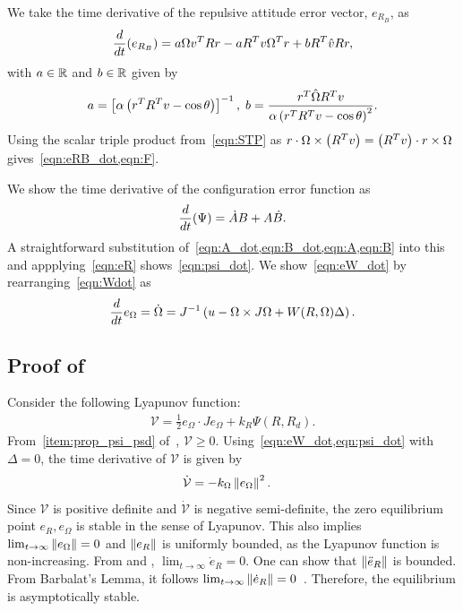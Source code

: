 \documentclass[fleqn]{IJCAS}  %
\begin{document}
\begin{multicols}{2}
We take the time derivative of the repulsive attitude error vector, \( e_{R_B} \), as
\begin{gather*}
	\frac{d }{d t}( e_{R_B} )= a \Omega v^T R r - a R^T v \Omega^T r + b R^T \hat{v} R r ,
\end{gather*}
with \( a \in \mathbb{R} \) and \( b \in \mathbb{R}\) given by 
\begin{gather*}
	a = \left[ \alpha \left( r^T R^T v - \cos \theta \right) \right]^{-1} , \;
	b = \frac{r^T \hat{\Omega} R^T v}{\alpha \left( r^T R^T v - \cos \theta \right)^2} .
\end{gather*}
Using the scalar triple product from~\cref{eqn:STP} as \( r \cdot \Omega \times \left( R^T v \right) = \left( R^T v \right) \cdot r \times \Omega \) gives~\cref{eqn:eRB_dot,eqn:F}.

We show the time derivative of the configuration error function as
\begin{gather*}
	\frac{d }{d t} (\Psi) = \dot{A} B + A \dot{B} .
\end{gather*}
A straightforward substitution of~\cref{eqn:A_dot,eqn:B_dot,eqn:A,eqn:B} into this and appplying~\cref{eqn:eR} shows~\cref{eqn:psi_dot}.
We show~\cref{eqn:eW_dot} by rearranging~\cref{eqn:Wdot} as 
\begin{align*}
	\frac{d }{d t} e_\Omega = \dot{\Omega} = J^{-1} \left( u - \Omega \times J \Omega + W(R,\Omega) \Delta  \right) .
\end{align*}

\subsection{Proof of~}\label{proof:att_control}
Consider the following Lyapunov function:
\begin{gather*}%
	\mathcal{V} = \frac{1}{2} e_\Omega \cdot J e_\Omega + k_R \Psi(R,R_d) . 
\end{gather*}
From~\cref{item:prop_psi_psd} of~, \(\mathcal{V} \geq 0 \).
Using~\cref{eqn:eW_dot,eqn:psi_dot} with \( \Delta = 0 \), the time derivative of \( \mathcal{V} \) is given by
\begin{align*}%
	\dot{\mathcal{V}} &= -k_\Omega \norm{e_\Omega}^2 . 
\end{align*}
Since \( \mathcal{V} \) is positive definite and \( \dot{\mathcal{V}} \) is negative semi-definite, the zero equilibrium point \( e_R, e_\Omega \) is stable in the sense of Lyapunov. 
This also implies \( \lim_{t\to\infty} \left\| e_\Omega \right\| = 0 \) and \( \left\| e_R \right\| \) is uniformly bounded, as the Lyapunov function is non-increasing. From  and , $\lim_{t\to\infty} \dot e_R =0$. 
One can show that \( \left\| \ddot{e}_R \right\| \) is bounded.
From Barbalat's Lemma, it follows \( \lim_{t\to\infty}\left\| \dot{e}_R \right\| = 0 \)~\cite[Lemma 8.2]{khalil1996}. 
Therefore, the equilibrium is asymptotically stable. 
	

\end{multicols}
\end{document}
